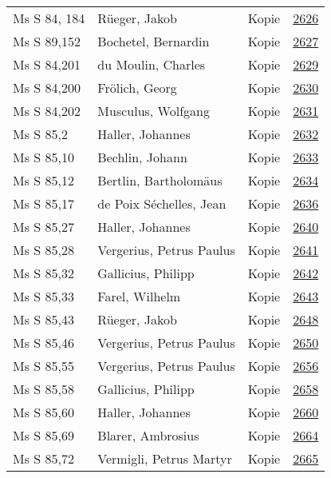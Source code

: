 \documentclass[10pt,a4paper,landscape]{report}
\begin{document}
\begin{longtable}{p{16cm}p{4cm}lr}
Ms S 84, 184	&	Rüeger, Jakob	&	Kopie	&	\href{http://130.60.24.72/assignment/2626}{2626}\\
Ms S 89,152	&	Bochetel, Bernardin	&	Kopie	&	\href{http://130.60.24.72/assignment/2627}{2627}\\
Ms S 84,201	&	du Moulin, Charles	&	Kopie	&	\href{http://130.60.24.72/assignment/2629}{2629}\\
Ms S 84,200	&	Frölich, Georg	&	Kopie	&	\href{http://130.60.24.72/assignment/2630}{2630}\\
Ms S 84,202	&	Musculus, Wolfgang	&	Kopie	&	\href{http://130.60.24.72/assignment/2631}{2631}\\
Ms S 85,2	&	Haller, Johannes	&	Kopie	&	\href{http://130.60.24.72/assignment/2632}{2632}\\
Ms S 85,10	&	Bechlin, Johann	&	Kopie	&	\href{http://130.60.24.72/assignment/2633}{2633}\\
Ms S 85,12	&	Bertlin, Bartholomäus	&	Kopie	&	\href{http://130.60.24.72/assignment/2634}{2634}\\
Ms S 85,17	&	de Poix Séchelles, Jean	&	Kopie	&	\href{http://130.60.24.72/assignment/2636}{2636}\\
Ms S 85,27	&	Haller, Johannes	&	Kopie	&	\href{http://130.60.24.72/assignment/2640}{2640}\\
Ms S 85,28	&	Vergerius, Petrus Paulus	&	Kopie	&	\href{http://130.60.24.72/assignment/2641}{2641}\\
Ms S 85,32	&	Gallicius, Philipp	&	Kopie	&	\href{http://130.60.24.72/assignment/2642}{2642}\\
Ms S 85,33	&	Farel, Wilhelm	&	Kopie	&	\href{http://130.60.24.72/assignment/2643}{2643}\\
Ms S 85,43	&	Rüeger, Jakob	&	Kopie	&	\href{http://130.60.24.72/assignment/2648}{2648}\\
Ms S 85,46	&	Vergerius, Petrus Paulus	&	Kopie	&	\href{http://130.60.24.72/assignment/2650}{2650}\\
Ms S 85,55	&	Vergerius, Petrus Paulus	&	Kopie	&	\href{http://130.60.24.72/assignment/2656}{2656}\\
Ms S 85,58	&	Gallicius, Philipp	&	Kopie	&	\href{http://130.60.24.72/assignment/2658}{2658}\\
Ms S 85,60	&	Haller, Johannes	&	Kopie	&	\href{http://130.60.24.72/assignment/2660}{2660}\\
Ms S 85,69	&	Blarer, Ambrosius	&	Kopie	&	\href{http://130.60.24.72/assignment/2664}{2664}\\
Ms S 85,72	&	Vermigli, Petrus Martyr	&	Kopie	&	\href{http://130.60.24.72/assignment/2665}{2665}\\

\end{longtable}
\end{document}
